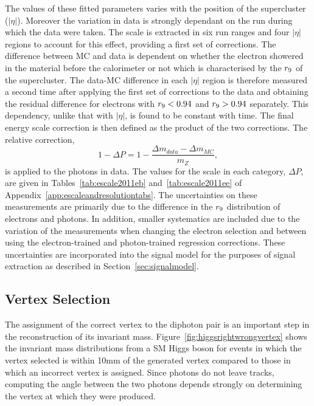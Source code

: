 The values of these fitted parameters varies with the position of the supercluster ($|\eta|$). Moreover the
variation in data is strongly dependant on the run during which the data were taken. The scale is extracted in 
six run ranges and four $|\eta|$ regions to account for this effect, providing a first set of corrections. 
The difference between MC and data is dependent on whether the electron showered in the material before the calorimeter
 or not which is characterised by the $r_{9}$ of the supercluster. 
The data-MC difference in each $|\eta|$ region is therefore measured
a second time after applying the first set of corrections to the data and obtaining the residual difference
for electrons with $r_{9}<0.94$ and $r_{9}>0.94$ separately. This dependency, 
unlike that with $|\eta|$, is found to be constant with time. The final energy scale correction is then defined
as the product of the two corrections. The relative correction, 
\begin{equation}
1-\Delta P = 1 - \frac {\displaystyle \Delta m_{data} - \Delta m_{MC} }{\displaystyle m_{Z} },
\end{equation}
is applied to the photons in data. The values for the scale in each category, $\Delta P$, are given in 
Tables~\ref{tab:escale2011eb} and~\ref{tab:escale2011ee} of Appendix~\ref{app:escaleandresolutiontabs}. 
The uncertainties on these measurements are primarily due to 
the difference in the $r_{9}$ distribution of electrons and photons. In addition, smaller systematics
are included due to the variation of the measurements when changing the electron selection and
between using the electron-trained and photon-trained regression corrections.
These uncertainties are incorporated into the signal model for the purposes of 
signal extraction as described in Section~\ref{sec:signalmodel}.

\subsection{Vertex Selection}
\label{sec:vertexselection}

The assignment of the correct vertex to the diphoton pair is an important step in the reconstruction of 
its invariant mass. Figure~\ref{fig:higgsrightwrongvertex} shows the invariant mass distributions from a SM
Higgs boson for events in which the vertex selected is within 10mm of the generated vertex
compared to those in which an incorrect vertex is assigned. 
Since photons do not leave tracks, computing the angle between the two photons 
depends strongly on determining the vertex at which they were produced.

